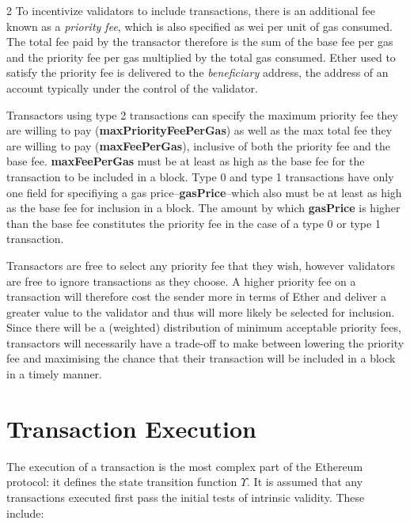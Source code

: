 \documentclass[9pt,oneside]{amsart}
\begin{document}
\begin{multicols}{2}
To incentivize validators to include transactions, there is an additional fee known as a \textit{priority fee}, which is also specified as wei per unit of gas consumed. The total fee paid by the transactor therefore is the sum of the base fee per gas and the priority fee per gas multiplied by the total gas consumed. Ether used to satisfy the priority fee is delivered to the \textit{beneficiary} address, the address of an account typically under the control of the validator.

Transactors using type 2 transactions can specify the maximum priority fee they are willing to pay (\textbf{maxPriorityFeePerGas}) as well as the max total fee they are willing to pay (\textbf{maxFeePerGas}), inclusive of both the priority fee and the base fee. \textbf{maxFeePerGas} must be at least as high as the base fee for the transaction to be included in a block. Type 0 and type 1 transactions have only one field for specifiying a gas price--\textbf{gasPrice}--which also must be at least as high as the base fee for inclusion in a block. The amount by which \textbf{gasPrice} is higher than the base fee constitutes the priority fee in the case of a type 0 or type 1 transaction.

Transactors are free to select any priority fee that they wish, however validators are free to ignore transactions as they choose. A higher priority fee on a transaction will therefore cost the sender more in terms of Ether and deliver a greater value to the validator and thus will more likely be selected for inclusion. Since there will be a (weighted) distribution of minimum acceptable priority fees, transactors will necessarily have a trade-off to make between lowering the priority fee and maximising the chance that their transaction will be included in a block in a timely manner.


\section{Transaction Execution} \label{ch:transactions}

The execution of a transaction is the most complex part of the Ethereum protocol: it defines the state transition function \hyperlink{Upsilon_state_transition}{$\Upsilon$}. It is assumed that any transactions executed first pass the initial tests of intrinsic validity. These include:


\end{multicols}
\end{document}
